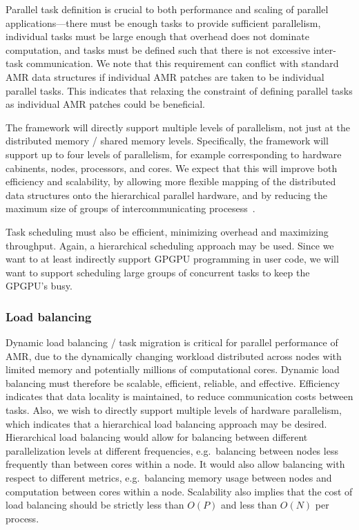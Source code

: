 \documentclass[10pt,twocolumn]{article}
\begin{document}
Parallel task definition is crucial to both performance and scaling of
parallel applications---there must be enough tasks to provide
sufficient parallelism, individual tasks must be large enough that
overhead does not dominate computation, and tasks must be defined such
that there is not excessive inter-task communication.  We note that
this requirement can conflict with standard AMR data structures if
individual AMR patches are taken to be individual parallel tasks.
This indicates that relaxing the constraint of defining parallel tasks
as individual AMR patches could be beneficial.

The framework will directly support multiple levels of parallelism,
not just at the distributed memory / shared memory levels.
Specifically, the framework will support up to four levels of
parallelism, for example corresponding to hardware cabinents, nodes,
processors, and cores.  We expect that this will improve both
efficiency and scalability, by allowing more flexible mapping of the
distributed data structures onto the hierarchical parallel hardware,
and by reducing the maximum size of groups of intercommunicating
procesess~\cite{BaBu09}.

Task scheduling must also be efficient, minimizing overhead and
maximizing throughput.  Again, a hierarchical scheduling approach may
be used.  Since we want to at least indirectly support GPGPU
programming in user code, we will want to support scheduling large
groups of concurrent tasks to keep the GPGPU's busy.

\subsubsection{Load balancing} \label{ss:require-balance}

Dynamic load balancing / task migration is critical for parallel
performance of AMR, due to the dynamically changing workload
distributed across nodes with limited memory and potentially millions
of computational cores.  Dynamic load balancing must therefore be
scalable, efficient, reliable, and effective.  Efficiency indicates
that data locality is maintained, to reduce communication costs
between tasks.  Also, we wish to directly support multiple levels of
hardware parallelism, which indicates that a hierarchical load
balancing approach may be desired.  Hierarchical load balancing would
allow for balancing between different parallelization levels at
different frequencies, e.g.~balancing between nodes less frequently
than between cores within a node.  It would also allow balancing with
respect to different metrics, e.g.~balancing memory usage between
nodes and computation between cores within a node.  Scalability also
implies that the cost of load balancing should be strictly less than
$O(P)$ and less than $O(N)$ per process.
\end{document}
